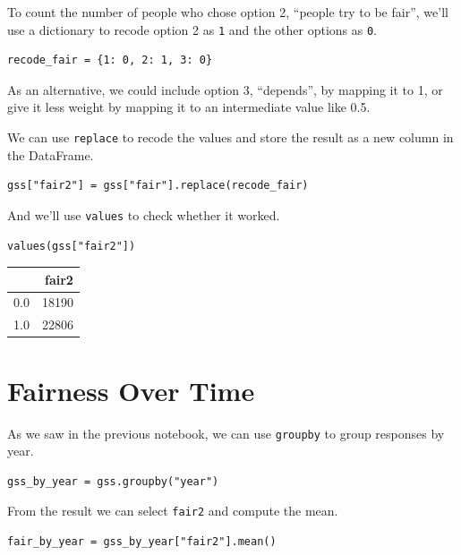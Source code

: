 To count the number of people who chose option 2, ``people try to be
fair'', we'll use a dictionary to recode option 2 as
\passthrough{\lstinline!1!} and the other options as
\passthrough{\lstinline!0!}.

\begin{lstlisting}[]
recode_fair = {1: 0, 2: 1, 3: 0}
\end{lstlisting}

As an alternative, we could include option 3, ``depends'', by mapping it
to 1, or give it less weight by mapping it to an intermediate value like
0.5.

We can use \passthrough{\lstinline!replace!} to recode the values and
store the result as a new column in the DataFrame.

\begin{lstlisting}[]
gss["fair2"] = gss["fair"].replace(recode_fair)
\end{lstlisting}

And we'll use \passthrough{\lstinline!values!} to check whether it
worked.

\begin{lstlisting}[]
values(gss["fair2"])
\end{lstlisting}

\begin{tabular}{lr}
\midrule
{} &  fair2 \\
\midrule
0.0 &  18190 \\
1.0 &  22806 \\
\midrule
\end{tabular}

\hypertarget{fairness-over-time}{%
\section{Fairness Over Time}\label{fairness-over-time}}

As we saw in the previous notebook, we can use
\passthrough{\lstinline!groupby!} to group responses by year.

\begin{lstlisting}[]
gss_by_year = gss.groupby("year")
\end{lstlisting}

From the result we can select \passthrough{\lstinline!fair2!} and
compute the mean.

\begin{lstlisting}[]
fair_by_year = gss_by_year["fair2"].mean()
\end{lstlisting}

